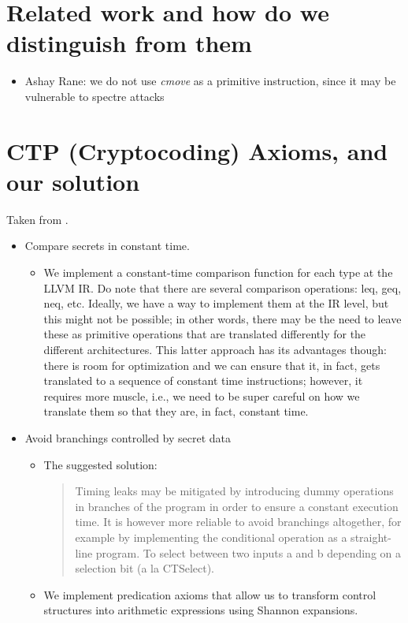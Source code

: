\section{Related work and how do we distinguish from them}
\begin{itemize}
\item Ashay Rane: we do not use \emph{cmove} as a primitive instruction, since it may be vulnerable to spectre attacks
\end{itemize}

\section{CTP (Cryptocoding) Axioms, and our solution}
Taken from \cite{cryptocoding}.
\begin{itemize}
\item Compare secrets in constant time.
\begin{itemize}
\item We implement a constant-time comparison function for each type at the LLVM IR. Do note that there are several comparison operations: leq, geq, neq, etc. Ideally, we have a way to implement them at the IR level, but this might not be possible; in other words, there may be the need to leave these as primitive operations that are translated differently for the different architectures. This latter approach has its advantages though: there is room for optimization and we can ensure that it, in fact, gets translated to a sequence of constant time instructions; however, it requires more muscle, i.e., we need to be super careful on how we translate them so that they are, in fact, constant time. 
\end{itemize}
\item Avoid branchings controlled by secret data
\begin{itemize}
\item The suggested solution: 
\begin{quote}
Timing leaks may be mitigated by introducing dummy operations in branches of the program in order to ensure a constant execution time. It is however more reliable to avoid branchings altogether, for example by implementing the conditional operation as a straight-line program. To select between two inputs a and b depending on a selection bit (a la CTSelect). 
\end{quote}
\item We implement predication axioms that allow us to transform control structures into arithmetic expressions using Shannon expansions.

\end{itemize}
\end{itemize}
